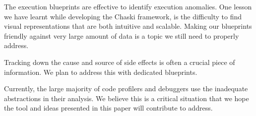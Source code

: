 \documentclass[10pt, conference, compsocconf]{IEEEtran}
\begin{document}
The execution blueprints are effective to identify execution anomalies. One lesson we have learnt while developing the Chaski framework, is the difficulty to find visual representations that are both intuitive and scalable. Making our blueprints friendly against very large amount of data is a topic we still need to properly address.


Tracking down the cause and source of side effects is often a crucial piece of information. We plan to address this with dedicated blueprints.

Currently, the large majority of code profilers and debuggers use the inadequate abstractions in their analysis. We believe this is a critical situation that we hope the tool and ideas presented in this paper will contribute to address.



\tiny

\end{document}
